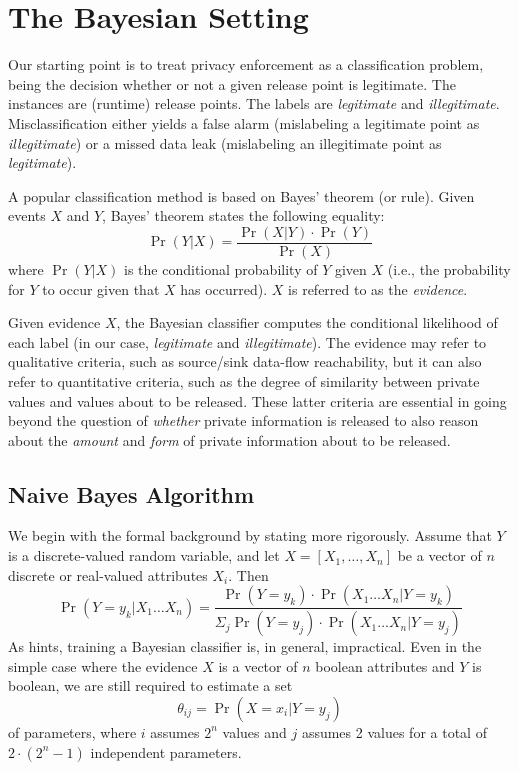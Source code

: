 \section{The Bayesian Setting}\label{Se:bayes}

Our starting point is to treat privacy enforcement as a classification problem, being the decision whether or not a given release point is legitimate. The instances are (runtime) release points. The labels are \emph{legitimate} and \emph{illegitimate}. Misclassification either yields a false alarm (mislabeling a legitimate point as \emph{illegitimate}) or a missed data leak (mislabeling an illegitimate point as \emph{legitimate}). 

A popular classification method is based on Bayes' theorem (or rule). Given events $X$ and $Y$, Bayes' theorem states the following equality:
\begin{equation}\label{Eq:bayes}
	\Pr(Y | X) = \frac{\Pr(X | Y) \cdot \Pr(Y)}{\Pr(X)}
\end{equation}
where $\Pr(Y | X)$ is the conditional probability of $Y$ given $X$ (i.e., the probability for $Y$ to occur given that $X$ has occurred).
%
$X$ is referred to as the \emph{evidence}. 

Given evidence $X$, the Bayesian classifier computes the conditional likelihood of each label (in our case, \emph{legitimate} and \emph{illegitimate}). The evidence may refer to qualitative criteria, such as source/sink data-flow reachability, but it can also refer to quantitative criteria, such as the degree of similarity between private values and values about to be released. These latter criteria are essential in going beyond the question of \emph{whether} private information is released to also reason about the \emph{amount} and \emph{form} of private information about to be released. 

\subsection{Naive Bayes Algorithm}

We begin with the formal background by stating  more rigorously. Assume that $Y$ is a discrete-valued random variable, and let $X=\left[ X_1,\ldots,X_n \right]$ be a vector of $n$ discrete or real-valued attributes $X_i$. Then
\begin{equation}\label{Eq:fullbayes}
	\Pr(Y=y_k | X_1 \ldots X_n) = \frac{\Pr(Y=y_k) \cdot \Pr(X_1 \ldots X_n | Y=y_k)}{\Sigma_j \Pr(Y=y_j) \cdot \Pr(X_1 \ldots X_n | Y=y_j)}
\end{equation}
As  hints, training a Bayesian classifier is, in general, impractical. Even in the simple case where the evidence $X$ is a vector of $n$ boolean attributes and $Y$ is boolean, we are still required to estimate a set
$$
	\theta_{ij} = \Pr(X=x_i|Y=y_j)
$$
of parameters, where $i$ assumes $2^n$ values and $j$ assumes 2 values for a total of $2 \cdot (2^n - 1)$ independent parameters.

